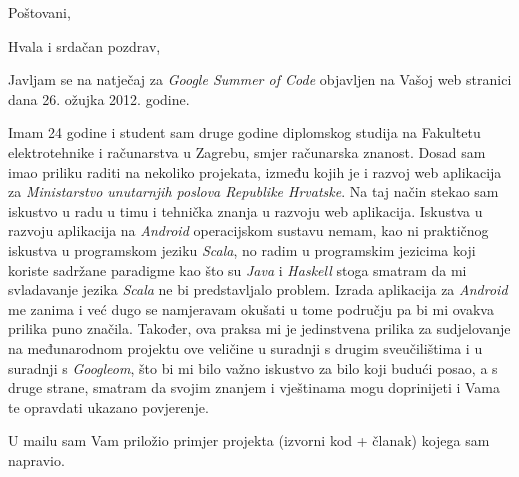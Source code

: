 \documentclass[11pt,a4paper,sans]{moderncv}   %
\begin{document}
\clearpage
\date{}
\opening{Poštovani,}
\closing{Hvala i srdačan pozdrav,}
\makelettertitle

Javljam se na natječaj za \textit{Google Summer of Code} objavljen na Vašoj web stranici dana 26. ožujka 2012. godine.

Imam 24 godine i student sam druge godine diplomskog studija na Fakultetu elektrotehnike i računarstva u Zagrebu, smjer računarska znanost. Dosad sam imao priliku raditi na nekoliko projekata, između kojih je i razvoj web aplikacija za \textit{Ministarstvo unutarnjih poslova Republike Hrvatske}. Na taj način stekao sam iskustvo u radu u timu i tehnička znanja u razvoju web aplikacija. Iskustva u razvoju aplikacija na \textit{Android} operacijskom sustavu nemam, kao ni praktičnog iskustva u programskom jeziku \textit{Scala}, no radim u programskim jezicima koji koriste sadržane paradigme kao što su \textit{Java} i \textit{Haskell} stoga smatram da mi svladavanje jezika \textit{Scala} ne bi predstavljalo problem. Izrada aplikacija za \textit{Android} me zanima i već dugo se namjeravam okušati u tome području pa bi mi ovakva prilika puno značila. Također, ova praksa mi je jedinstvena prilika za sudjelovanje na međunarodnom projektu ove veličine u suradnji s drugim sveučilištima i u suradnji s \textit{Googleom}, što bi mi bilo važno iskustvo za bilo koji budući posao, a s druge strane, smatram da svojim znanjem i vještinama mogu doprinijeti i Vama te opravdati ukazano povjerenje. 

U mailu sam Vam priložio primjer projekta (izvorni kod + članak) kojega sam napravio. 

\makeletterclosing

\end{document}
